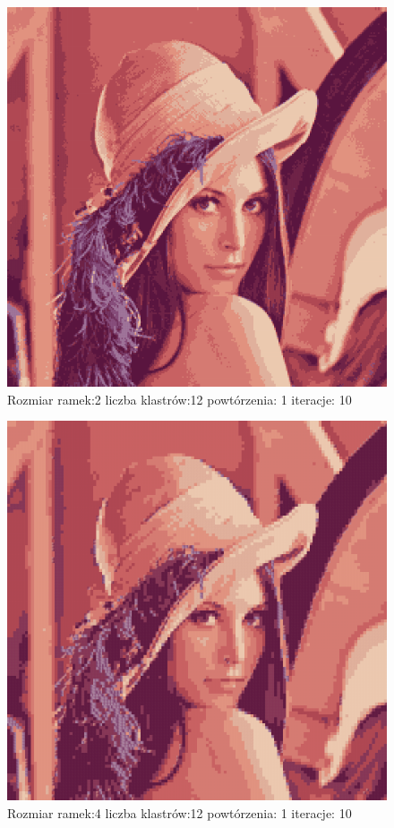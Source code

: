 \documentclass{classrep}
\begin{document}
{{{{                    \begin{figure}[!htbp]
                        \centering
                        \includegraphics[width=\textwidth,width=90mm]{obrazy/lenna_R2_K12_P1_It10.png}
                        \caption{Rozmiar ramek:2 liczba klastrów:12 powtórzenia: 1 iteracje: 10 }
                    \end{figure}

                    \begin{figure}[!htbp]
                        \centering
                        \includegraphics[width=\textwidth,width=90mm]{obrazy/lenna_R4_K12_P1_It10.png}
                        \caption{Rozmiar ramek:4 liczba klastrów:12 powtórzenia: 1 iteracje: 10 }
                    \end{figure}

}}}}
\end{document}
